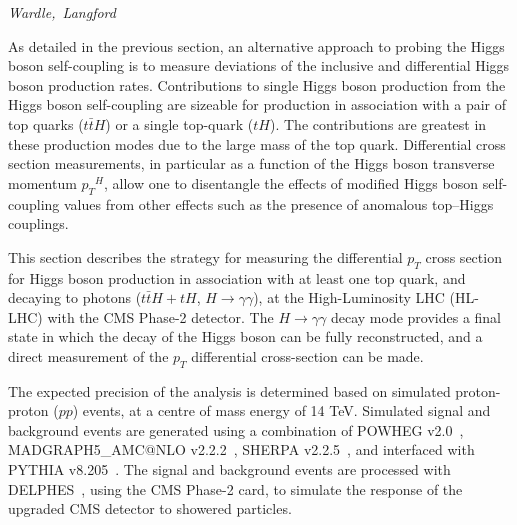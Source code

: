 \newcommand{\ttH}{\ensuremath{t\bar{t}H}}
\newcommand{\pt}{\ensuremath{p_{T}}}
\newcommand{\ptH}{\ensuremath{\pt^{H}}}

\newcommand{\tH}{\ensuremath{tH}}
\newcommand{\tHW}{\ensuremath{tHW}}
\newcommand{\tHQ}{\ensuremath{tHq}}
\newcommand{\VH}{\ensuremath{VH}}
\newcommand{\ggH}{\ensuremath{gg\rightarrow H}}
\newcommand{\mgg}{\ensuremath{m_{\gamma\gamma}}}
\newcommand{\ptgg}{\ensuremath{\pt^{\gamma\gamma}}}

\newcommand{\hgg}{\ensuremath{H\rightarrow\gamma\gamma}}


\begin{center}
\textit{Wardle,~Langford}
\end{center}


As detailed in the previous section, an alternative approach to probing the Higgs boson self-coupling is to measure deviations of the inclusive and differential Higgs boson production rates. Contributions to single Higgs boson production from the Higgs boson self-coupling are sizeable for production in association with a pair of top quarks ($\ttH$) or a single top-quark ($\tH$). The contributions are  greatest in these production modes due to the large mass of the top quark. Differential cross section measurements, in particular as a function of the Higgs boson 
transverse momentum $\pt^{H}$, allow one to disentangle the effects of modified Higgs boson self-coupling values from 
other effects such as the presence of anomalous top--Higgs couplings.  

This section describes the strategy for measuring the differential $\pt$ cross section for 
Higgs boson production in association with at least one top quark, and decaying to photons ($\ttH+\tH$, $\hgg$), 
at the High-Luminosity LHC (HL-LHC) with the CMS Phase-2 detector. The $\hgg$ decay mode provides a final state in which the decay of the Higgs boson can be fully reconstructed, and a direct measurement of the $\pt$ differential cross-section can be made. 

The expected precision of the analysis is determined based on simulated proton-proton ($pp$) events, at a centre of mass energy of 14 TeV.
Simulated signal and background events are generated using a combination of {\sc POWHEG}
v2.0~\cite{Alioli:2010xd,Nason:2009ai}, {\sc MADGRAPH5\_AMC@NLO} v2.2.2~\cite{Alwall:2014hca}, {\sc SHERPA} v2.2.5~\cite{Gleisberg:2008ta}, and interfaced with {\sc PYTHIA} v8.205~\cite{Sjostrand:2007gs}. The signal and background events are processed with {\sc DELPHES}~\cite{deFavereau2014}, using the CMS Phase-2 card, to simulate the response of the upgraded CMS detector to showered particles. 

